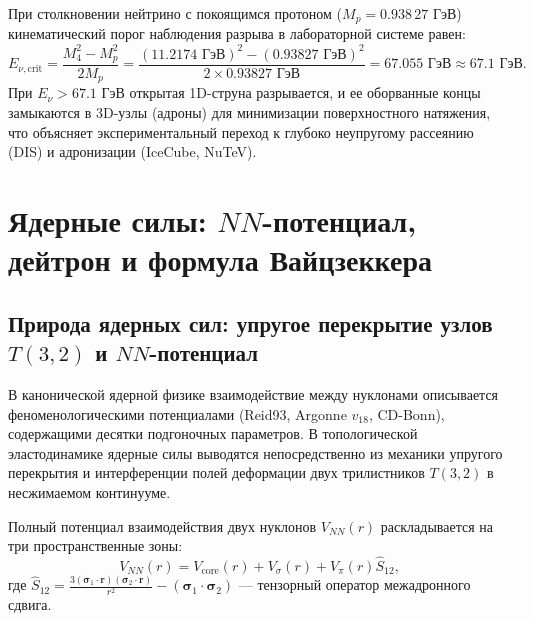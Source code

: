 \documentclass[11pt,a4paper]{article}
\theoremstyle{definition}
\theoremstyle{remark}
\begin{document}
При столкновении нейтрино с покоящимся протоном ($M_p = 0.938\,27$ ГэВ) кинематический порог наблюдения разрыва в лабораторной системе равен:
\begin{equation}
	E_{\nu, \text{crit}} = \frac{M_4^2 - M_p^2}{2 M_p} = \frac{(11.2174 \text{ ГэВ})^2 - (0.93827 \text{ ГэВ})^2}{2 \times 0.93827 \text{ ГэВ}} = \mathbf{67.055 \text{ ГэВ}} \approx \mathbf{67.1 \text{ ГэВ}}.
\end{equation}
При $E_\nu > 67.1$ ГэВ открытая 1D-струна разрывается, и ее оборванные концы замыкаются в 3D-узлы (адроны) для минимизации поверхностного натяжения, что объясняет экспериментальный переход к глубоко неупругому рассеянию (DIS) и адронизации (IceCube, NuTeV).


\section{Ядерные силы: $NN$-потенциал, дейтрон и формула Вайцзеккера}
\label{sec:nuclear}

\subsection{Природа ядерных сил: упругое перекрытие узлов $T(3,2)$ и $NN$-потенциал}
В канонической ядерной физике взаимодействие между нуклонами описывается феноменологическими потенциалами (Reid93, Argonne $v_{18}$, CD-Bonn), содержащими десятки подгоночных параметров. В топологической эластодинамике ядерные силы выводятся непосредственно из механики упругого перекрытия и интерференции полей деформации двух трилистников $T(3,2)$ в несжимаемом континууме.

Полный потенциал взаимодействия двух нуклонов $V_{NN}(r)$ раскладывается на три пространственные зоны:
\begin{equation}
    V_{NN}(r) = V_{\mathrm{core}}(r) + V_\sigma(r) + V_\pi(r) \hat{S}_{12},
    \label{eq:v_nn_structure}
\end{equation}
где $\hat{S}_{12} = \frac{3(\boldsymbol{\sigma}_1 \cdot \mathbf{r})(\boldsymbol{\sigma}_2 \cdot \mathbf{r})}{r^2} - (\boldsymbol{\sigma}_1 \cdot \boldsymbol{\sigma}_2)$ --- тензорный оператор межадронного сдвига.
\end{document}
